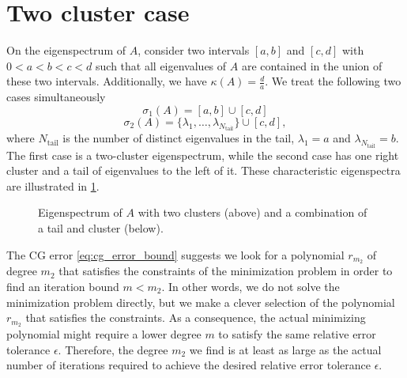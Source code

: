 \section{Two cluster case}\label{sec:cg_sharpened_convrate}
On the eigenspectrum of $A$, consider two intervals $[a, b]$ and $[c, d]$ with $0 < a < b < c < d$ such that all eigenvalues of $A$ are contained in the union of these two intervals. Additionally, we have $\kappa(A) = \frac{d}{a}$. We treat the following two cases simultaneously
\begin{equation}
    \sigma_1(A) = [a,b] \cup [c,d]
    \label{eq:two_clusters}
\end{equation}
\begin{equation}
    \sigma_2(A) = \{\lambda_1, \ldots, \lambda_{N_{\text{tail}}}\} \cup [c,d],
    \label{eq:one_cluster_with_tail}
\end{equation}
where $N_{\text{tail}}$ is the number of distinct eigenvalues in the tail, $\lambda_1 = a$ and $\lambda_{N_{\text{tail}}} = b$. The first case is a two-cluster eigenspectrum, while the second case has one right cluster and a tail of eigenvalues to the left of it. These characteristic eigenspectra are illustrated in \cref{fig:eigenvalue_clusters}.
\begin{figure}[H]
    \centering
    
    \caption{Eigenspectrum of $A$ with two clusters (above) and a combination of a tail and cluster (below).}
    \label{fig:eigenvalue_clusters}
\end{figure}

The CG error \cref{eq:cg_error_bound} suggests we look for a polynomial $r_{m_2}$ of degree $m_2$ that satisfies the constraints of the minimization problem in order to find an iteration bound $m < m_2$. In other words, we do not solve the minimization problem directly, but we make a clever selection of the polynomial $r_{m_2}$ that satisfies the constraints. As a consequence, the actual minimizing polynomial might require a lower degree $m$ to satisfy the same relative error tolerance $\epsilon$. Therefore, the degree $m_2$ we find is at least as large as the actual number of iterations required to achieve the desired relative error tolerance $\epsilon$.

